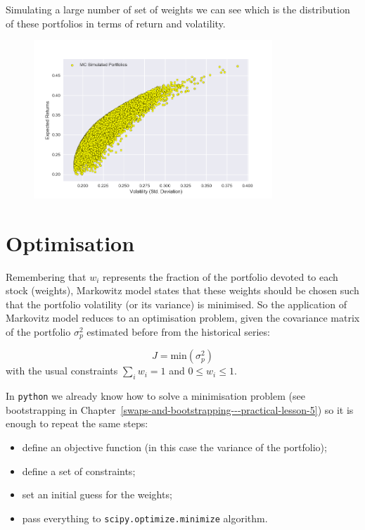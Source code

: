 Simulating a large number of set of weights we can see which is the
distribution of these portfolios in terms of return and volatility.

    \begin{figure}
    \centering
    \includegraphics[width=0.8\textwidth]{Figure_1.png}
    \end{figure}


\section{Optimisation}\label{optimization}

Remembering that \(w_i\) represents the fraction of the portfolio
devoted to each stock (weights), Markowitz model states that these
weights should be chosen such that the portfolio volatility (or its
variance) is minimised. So the application of Markovitz model reduces to
an optimisation problem, given the covariance matrix of the portfolio
\(\sigma_p^2\) estimated before from the historical series:

\[ J = \textrm{min}(\sigma_p^2) \]
with the usual constraints \(\sum_{i}w_i = 1\) and \(0 \le w_i \le 1\).

In \texttt{python} we already know how to solve a minimisation problem
(see bootstrapping in Chapter~\ref{swaps-and-bootstrapping---practical-lesson-5}) so it is enough to repeat the same steps:

\begin{itemize}
\tightlist
\item
  define an objective function (in this case the variance of the
  portfolio);
\item
  define a set of constraints;
\item
  set an initial guess for the weights;
\item
  pass everything to \texttt{scipy.optimize.minimize} algorithm.
\end{itemize}

